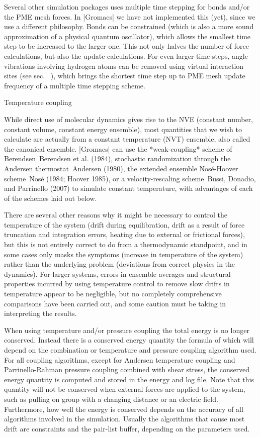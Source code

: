 Several other simulation packages uses multiple time stepping for bonds
and/or the PME mesh forces. In |Gromacs| we have not implemented this
(yet), since we use a different philosophy. Bonds can be constrained
(which is also a more sound approximation of a physical quantum
oscillator), which allows the smallest time step to be increased to the
larger one. This not only halves the number of force calculations, but
also the update calculations. For even larger time steps, angle
vibrations involving hydrogen atoms can be removed using virtual
interaction sites (see sec. 
), which brings the
shortest time step up to PME mesh update frequency of a multiple time
stepping scheme.

Temperature coupling
~~~~~~~~~~~~~~~~~~~~

While direct use of molecular dynamics gives rise to the NVE (constant
number, constant volume, constant energy ensemble), most quantities that
we wish to calculate are actually from a constant temperature (NVT)
ensemble, also called the canonical ensemble. |Gromacs| can use the
*weak-coupling* scheme of Berendsen Berendsen et al. (1984), stochastic
randomization through the Andersen thermostat Andersen (1980), the
extended ensemble Nosé-Hoover scheme Nosé (1984; Hoover 1985), or a
velocity-rescaling scheme Bussi, Donadio, and Parrinello (2007) to
simulate constant temperature, with advantages of each of the schemes
laid out below.

There are several other reasons why it might be necessary to control the
temperature of the system (drift during equilibration, drift as a result
of force truncation and integration errors, heating due to external or
frictional forces), but this is not entirely correct to do from a
thermodynamic standpoint, and in some cases only masks the symptoms
(increase in temperature of the system) rather than the underlying
problem (deviations from correct physics in the dynamics). For larger
systems, errors in ensemble averages and structural properties incurred
by using temperature control to remove slow drifts in temperature appear
to be negligible, but no completely comprehensive comparisons have been
carried out, and some caution must be taking in interpreting the
results.

When using temperature and/or pressure coupling the total energy is no
longer conserved. Instead there is a conserved energy
quantity
the formula of
which will depend on the combination or temperature and pressure
coupling algorithm used. For all coupling algorithms, except for
Andersen temperature coupling and Parrinello-Rahman pressure coupling
combined with shear stress, the conserved energy quantity is computed
and stored in the energy and log file. Note that this quantity will not
be conserved when external forces are applied to the system, such as
pulling on group with a changing distance or an electric field.
Furthermore, how well the energy is conserved depends on the accuracy of
all algorithms involved in the simulation. Usually the algorithms that
cause most drift are constraints and the pair-list buffer, depending on
the parameters used.

